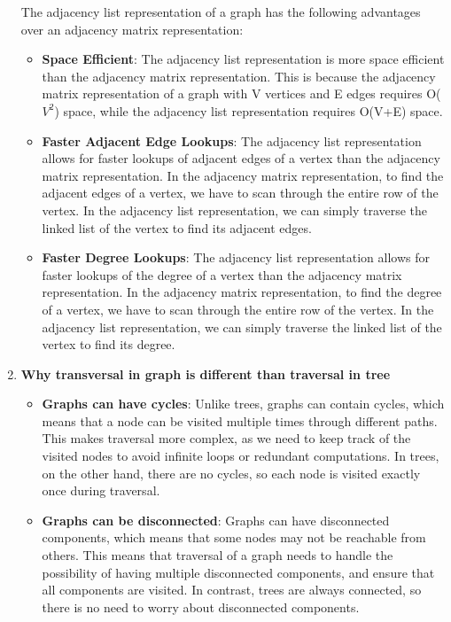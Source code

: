 \documentclass[11pt]{article}
\begin{document}
\begin{enumerate}
The adjacency list representation of a graph has the following advantages over an adjacency matrix representation:
\begin{itemize}
    \item \textbf{Space Efficient}: The adjacency list representation is more space efficient than the adjacency matrix representation. This is because the adjacency matrix representation of a graph with V vertices and E edges requires O($V^2$) space, while the adjacency list representation requires O(V+E) space.
    \item \textbf{Faster Adjacent Edge Lookups}: The adjacency list representation allows for faster lookups of adjacent edges of a vertex than the adjacency matrix representation. In the adjacency matrix representation, to find the adjacent edges of a vertex, we have to scan through the entire row of the vertex. In the adjacency list representation, we can simply traverse the linked list of the vertex to find its adjacent edges.
    \item \textbf{Faster Degree Lookups}: The adjacency list representation allows for faster lookups of the degree of a vertex than the adjacency matrix representation. In the adjacency matrix representation, to find the degree of a vertex, we have to scan through the entire row of the vertex. In the adjacency list representation, we can simply traverse the linked list of the vertex to find its degree.
\end{itemize}

\item \textbf{Why transversal in graph is different than traversal in tree}\\

\begin{itemize}
    \item \textbf{Graphs can have cycles}: Unlike trees, graphs can contain cycles, which means that a node can be visited multiple times through different paths. This makes traversal more complex, as we need to keep track of the visited nodes to avoid infinite loops or redundant computations. In trees, on the other hand, there are no cycles, so each node is visited exactly once during traversal.

    \item \textbf{Graphs can be disconnected}: Graphs can have disconnected components, which means that some nodes may not be reachable from others. This means that traversal of a graph needs to handle the possibility of having multiple disconnected components, and ensure that all components are visited. In contrast, trees are always connected, so there is no need to worry about disconnected components.
    

\end{itemize}
\end{enumerate}
\end{document}
